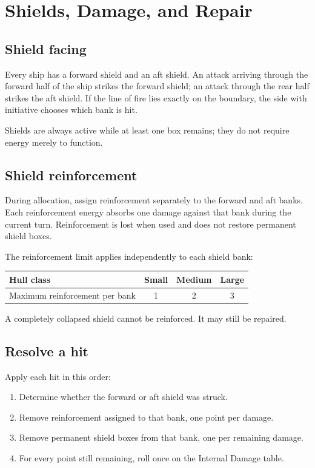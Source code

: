 \chapter{Shields, Damage, and Repair}

\section{Shield facing}

Every ship has a forward shield and an aft shield. An attack arriving through the forward half of the ship strikes the forward shield; an attack through the rear half strikes the aft shield. If the line of fire lies exactly on the boundary, the side with initiative chooses which bank is hit.

Shields are always active while at least one box remains; they do not require energy merely to function.

\section{Shield reinforcement}

During allocation, assign reinforcement separately to the forward and aft banks. Each reinforcement energy absorbs one damage against that bank during the current turn. Reinforcement is lost when used and does not restore permanent shield boxes.

The reinforcement limit applies independently to each shield bank:

\begin{center}
\begin{tabular}{lccc}\toprule
Hull class & Small & Medium & Large\\\midrule
Maximum reinforcement per bank & 1 & 2 & 3\\\bottomrule
\end{tabular}
\end{center}

A completely collapsed shield cannot be reinforced. It may still be repaired.

\section{Resolve a hit}

Apply each hit in this order:

\begin{enumerate}
  \item Determine whether the forward or aft shield was struck.
  \item Remove reinforcement assigned to that bank, one point per damage.
  \item Remove permanent shield boxes from that bank, one per remaining damage.
  \item For every point still remaining, roll once on the Internal Damage table.
\end{enumerate}

